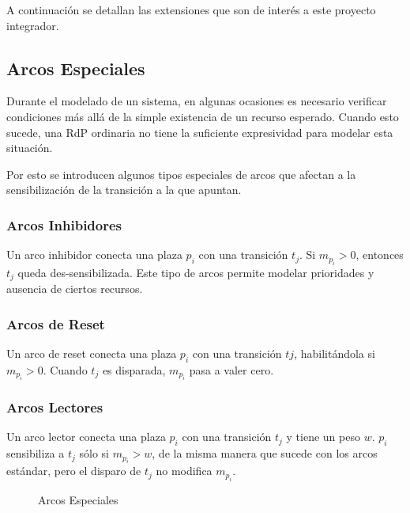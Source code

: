 A continuación se detallan las extensiones que son de interés a este proyecto
integrador.

\subsection{Arcos Especiales}

Durante el modelado de un sistema, en algunas ocasiones es necesario verificar
condiciones más allá de la simple existencia de un recurso esperado.
Cuando esto sucede, una RdP ordinaria no tiene la suficiente expresividad para
modelar esta situación.

Por esto se introducen algunos tipos especiales de arcos que afectan a la
sensibilización de la transición a la que apuntan.

\subsubsection{Arcos Inhibidores}

Un arco inhibidor conecta una plaza $p_{i}$ con una transición $t_{j}$. Si
$m_{p_i} > 0$, entonces $t_{j}$ queda des-sensibilizada.
Este tipo de arcos permite modelar prioridades y ausencia de ciertos recursos.

\subsubsection{Arcos de Reset}

Un arco de reset conecta una plaza $p_{i}$ con una transición $t{j}$,
habilitándola si $m_{p_{i}} > 0$.
Cuando $t_{j}$ es disparada, $m_{p_{i}}$ pasa a valer cero.

\subsubsection{Arcos Lectores}

Un arco lector conecta una plaza $p_{i}$ con una transición $t_{j}$ y tiene un
peso $w$.
$p_{i}$ sensibiliza a $t_{j}$ sólo si $m_{p_{i}} > w$, de la misma manera que
sucede con los arcos estándar, pero el disparo de $t_{j}$ no modifica
$m_{p_{i}}$.

\begin{figure}[h]
  \centering
  \caption{Arcos Especiales}
  \label{fig:arcos_especiales}
\end{figure}

